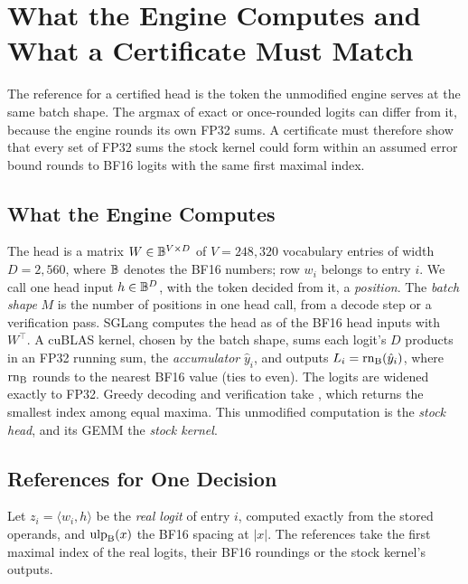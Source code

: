 \section{What the Engine Computes and What a Certificate Must Match}\label{sec:contract}\label{sec:semantics}
The reference for a certified head is the token the unmodified engine serves at the same batch shape. The argmax of exact or once-rounded logits can differ from it, because the engine rounds its own FP32 sums. A certificate must therefore show that every set of FP32 sums the stock kernel could form within an assumed error bound rounds to BF16 logits with the same first maximal index.

\subsection{What the Engine Computes}\label{sec:stock}
The head is a matrix $W\in\mathbb B^{V\times D}$ of $V=248{,}320$ vocabulary entries of width $D=2{,}560$, where $\mathbb B$ denotes the BF16 numbers; row $w_i$ belongs to entry $i$. We call one head input $h\in\mathbb B^D$, with the token decided from it, a \emph{position}. The \emph{batch shape} $M$ is the number of positions in one head call, from a decode step or a verification pass. SGLang computes the head as  of the BF16 head inputs with $W^\top$. A cuBLAS kernel, chosen by the batch shape, sums each logit's $D$ products in an FP32 running sum, the \emph{accumulator} $\hat y_i$, and outputs $L_i=\operatorname{rn}_{\mathrm{B}}(\hat y_i)$, where $\operatorname{rn}_{\mathrm{B}}$ rounds to the nearest BF16 value (ties to even). The logits are widened exactly to FP32. Greedy decoding and verification take , which returns the smallest index among equal maxima. This unmodified computation is the \emph{stock head}, and its GEMM the \emph{stock kernel}.

\subsection{References for One Decision}\label{sec:headcontracts}
Let $z_i=\langle w_i,h\rangle$ be the \emph{real logit} of entry $i$, computed exactly from the stored operands, and $\operatorname{ulp}_{\mathrm{B}}(x)$ the BF16 spacing at $|x|$. The references take the first maximal index of the real logits, their BF16 roundings or the stock kernel's outputs.

